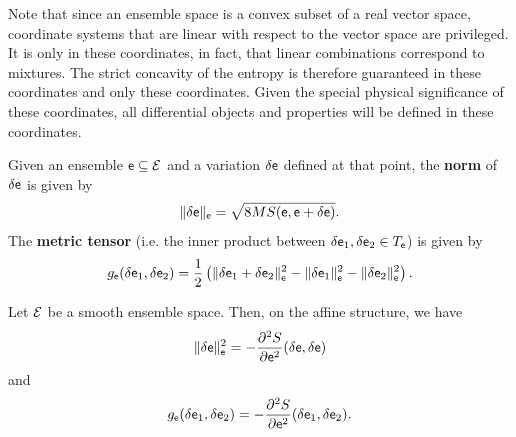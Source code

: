\begin{mathSection}
\begin{remark}
	Note that since an ensemble space is a convex subset of a real vector space, coordinate systems that are linear with respect to the vector space are privileged. It is only in these coordinates, in fact, that linear combinations correspond to mixtures. The strict concavity of the entropy is therefore guaranteed in these coordinates and only these coordinates. Given the special physical significance of these coordinates, all differential objects and properties will be defined in these coordinates.
\end{remark}

\begin{defn}
	Given an ensemble $\mathsf{e} \subseteq \mathcal{E}$ and a variation $\delta \mathsf{e}$ defined at that point, the \textbf{norm} of $\delta \mathsf{e}$ is given by
	$$ \lVert \delta \mathsf{e} \rVert_{\mathsf{e}} = \sqrt{ 8 MS(\mathsf{e}, \mathsf{e} + \delta \mathsf{e}) }.$$
	The \textbf{metric tensor} (i.e. the inner product between $\delta \mathsf{e}_1 , \delta \mathsf{e}_2 \in T_{\mathsf{e}}$) is given by
	$$ g_{\mathsf{e}}( \delta \mathsf{e}_1, \delta \mathsf{e}_2 ) = \frac{1}{2} \left( \lVert \delta \mathsf{e}_1 + \delta \mathsf{e}_2 \rVert_{\mathsf{e}}^2 - \lVert \delta \mathsf{e}_1 \rVert_{\mathsf{e}}^2 - \lVert \delta \mathsf{e}_2 \rVert_{\mathsf{e}}^2 \right).$$
\end{defn}

\begin{thrm}
	Let $\mathcal{E}$ be a smooth ensemble space. Then, on the affine structure, we have
	$$ \lVert \delta \mathsf{e} \rVert_{\mathsf{e}}^2 = - \frac{\partial^2 S}{\partial \mathsf{e}^2}(\delta \mathsf{e} , \delta \mathsf{e}) $$
	and 
	$$ g_{\mathsf{e}}( \delta \mathsf{e}_1, \delta \mathsf{e}_2 ) = - \frac{\partial^2 S}{\partial \mathsf{e} ^2}( \delta \mathsf{e}_1, \delta \mathsf{e}_2 ).$$
\end{thrm}


\end{mathSection}
